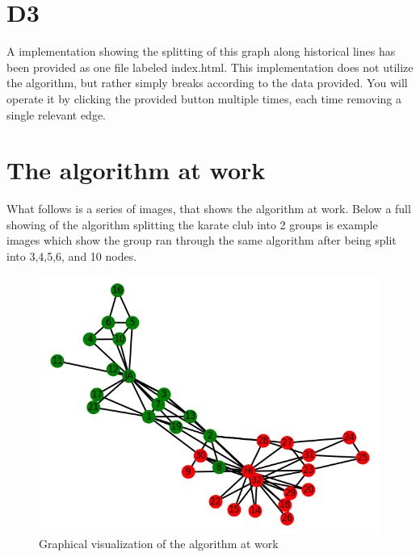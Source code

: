 \documentclass[11pt]{article}
\begin{document}
	\section{D3}
	\hspace{10mm} A implementation showing the splitting of this graph along historical lines has been provided as one file labeled index.html. This implementation does not utilize the algorithm, but rather simply breaks according to the data provided. You will operate it by clicking the provided button multiple times, each time removing a single relevant edge. 
	
	\section{The algorithm at work}
	What follows is a series of images, that shows the algorithm at work. Below a full showing of the algorithm splitting the karate club into 2 groups is example images which show the group ran through the same algorithm after being split into 3,4,5,6, and 10 nodes. 
	\begin{figure}[h!]
		\includegraphics[scale=0.5]{resources/myplot17.png}
		\caption{Graphical visualization of the algorithm at work }
	\end{figure}
\end{document}
